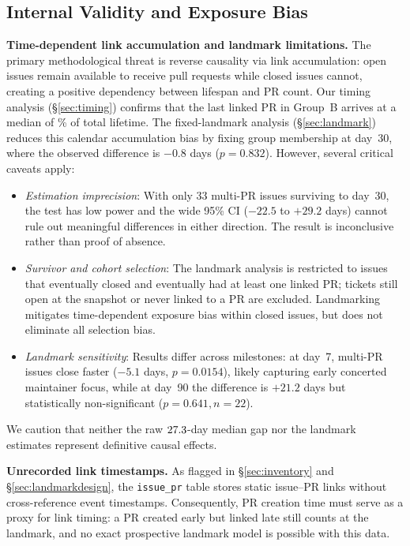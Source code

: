 \subsection{Internal Validity and Exposure Bias}\label{sec:threats_internal}
\textbf{Time-dependent link accumulation and landmark limitations.} The primary methodological threat is reverse causality via link accumulation: open issues remain available to receive pull requests while closed issues cannot, creating a positive dependency between lifespan and PR count. Our timing analysis (\S\ref{sec:timing}) confirms that the last linked PR in Group~B arrives at a median of \valtMedLast\% of total lifetime. The fixed-landmark analysis (\S\ref{sec:landmark}) reduces this calendar accumulation bias by fixing group membership at day~30, where the observed difference is $-0.8$ days ($p=0.832$). However, several critical caveats apply:
\begin{itemize}
  \item \emph{Estimation imprecision}: With only 33 multi-PR issues surviving to day~30, the test has low power and the wide 95\% CI ($-22.5$ to $+29.2$ days) cannot rule out meaningful differences in either direction. The result is inconclusive rather than proof of absence.
  \item \emph{Survivor and cohort selection}: The landmark analysis is restricted to issues that eventually closed and eventually had at least one linked PR; tickets still open at the snapshot or never linked to a PR are excluded. Landmarking mitigates time-dependent exposure bias within closed issues, but does not eliminate all selection bias.
  \item \emph{Landmark sensitivity}: Results differ across milestones: at day~7, multi-PR issues close faster ($-5.1$ days, $p=0.0154$), likely capturing early concerted maintainer focus, while at day~90 the difference is $+21.2$ days but statistically non-significant ($p=0.641, n=22$).
\end{itemize}
We caution that neither the raw $27.3$-day median gap nor the landmark estimates represent definitive causal effects.

\textbf{Unrecorded link timestamps.} As flagged in \S\ref{sec:inventory} and \S\ref{sec:landmarkdesign}, the \texttt{issue\_pr} table stores static issue--PR links without cross-reference event timestamps. Consequently, PR creation time must serve as a proxy for link timing: a PR created early but linked late still counts at the landmark, and no exact prospective landmark model is possible with this data.

